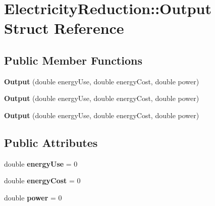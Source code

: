 \hypertarget{struct_electricity_reduction_1_1_output}{}\section{Electricity\+Reduction\+:\+:Output Struct Reference}
\label{struct_electricity_reduction_1_1_output}
\subsection*{Public Member Functions}
\begin{DoxyCompactItemize}
\item 
\mbox{\label{struct_electricity_reduction_1_1_output_a1c9b9b61b468086f873e6afbb1f04e4e}} 
{\bfseries Output} (double energy\+Use, double energy\+Cost, double power)
\item 
\mbox{\label{struct_electricity_reduction_1_1_output_a1c9b9b61b468086f873e6afbb1f04e4e}} 
{\bfseries Output} (double energy\+Use, double energy\+Cost, double power)
\item 
\mbox{\label{struct_electricity_reduction_1_1_output_a1c9b9b61b468086f873e6afbb1f04e4e}} 
{\bfseries Output} (double energy\+Use, double energy\+Cost, double power)
\end{DoxyCompactItemize}
\subsection*{Public Attributes}
\begin{DoxyCompactItemize}
\item 
\mbox{\label{struct_electricity_reduction_1_1_output_ae92209a51a974bdc3918e5f6d4045a79}} 
double {\bfseries energy\+Use} = 0
\item 
\mbox{\label{struct_electricity_reduction_1_1_output_abba49b6b22b004878962b7814aef4a3d}} 
double {\bfseries energy\+Cost} = 0
\item 
\mbox{\label{struct_electricity_reduction_1_1_output_a402b2cb604d2dd8e5ba130a44b815860}} 
double {\bfseries power} = 0
\end{DoxyCompactItemize}



